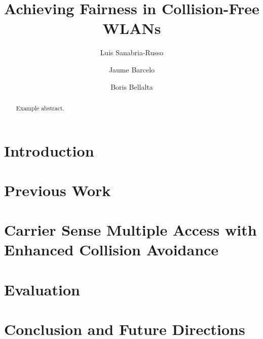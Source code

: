 \documentclass[]{llncs}
\begin{document}
\title{Achieving Fairness in Collision-Free WLANs}
\author{Luis Sanabria-Russo \and Jaume Barcelo \and Boris Bellalta}
\maketitle

\begin{abstract}
Example abstract.
\end{abstract}

\section{Introduction}\label{introduction}
	
\section{Previous Work}\label{previousWork}
	
\section{Carrier Sense Multiple Access with Enhanced Collision Avoidance}\label{ECA}
	
\section{Evaluation}\label{evaluation}
	
\section{Conclusion and Future Directions}\label{conclusion}
	



\end{document}
